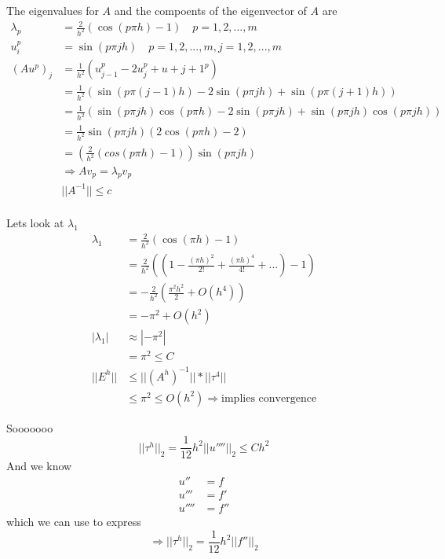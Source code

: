 \documentclass[10pt]{article}
\begin{document}
The eigenvalues for $A$ and the compoents of the eigenvector of $A$ are
\begin{align*}
    \lambda_p &= \frac{2}{h^2}(\cos(p \pi h) - 1) \quad \text{$p = 1,2,...,m$}\\
    u_i^p &= \sin(p \pi j h) \quad p = 1,2,...,m , j=1,2,...,m\\
    (Au^p)_j &= \frac{1}{h^2}(u_{j-1}^p - 2u_j^p + u+{j+1}^p)\\
             &= \frac{1}{h^2}(\sin(p \pi (j-1) h) - 2\sin(p \pi j h) + \sin(p \pi (j + 1) h))\\
             &= \frac{1}{h^2}(\sin(p \pi j h)\cos(p \pi h) - 2\sin(p \pi j h) + \sin(p \pi j h)\cos(p \pi j h))\\
             &= \frac{1}{h^2} \sin(p \pi j h)(2 \cos(p \pi h) - 2)\\
             &= (\frac{2}{h^2} (cos(p \pi h) - 1)) \sin(p \pi j h)\\
             &\Rightarrow Av_p = \lambda_p v_p\\
             &||A^{-1}|| \leq c\\
\end{align*}


Lets look at $\lambda_1$
\begin{align*}
    \lambda_1 &= \frac{2}{h^2} (\cos(\pi h) - 1)\\
              &= \frac{2}{h^2} ((1 - \frac{(\pi h)^2}{2!} + \frac{(\pi h)^4}{4!} + ...) - 1)\\
              &= -\frac{2}{h^2} (\frac{\pi^2 h^2}{2} + O(h^4))\\
              &= -\pi^2 + O(h^2)\\
  |\lambda_1| &\approx |-\pi^2|\\
              &= \pi^2 \leq C\\
        ||E^h|| &\leq ||(A^h)^{-1}|| * ||\tau^4||\\
                &\leq \pi^2 \leq O(h^2) \Rightarrow \text{implies convergence}
\end{align*}

Sooooooo
\[||\tau^h||_2 = \frac{1}{12} h^2 ||u''''||_2 \leq Ch^2\]
And we know
\begin{align*}
    u'' &= f\\
    u''' &= f'\\
    u'''' &= f''
\end{align*}
which we can use to express
\[\Rightarrow ||\tau^h||_2 = \frac{1}{12}h^2||f''||_2\]
\end{document}
